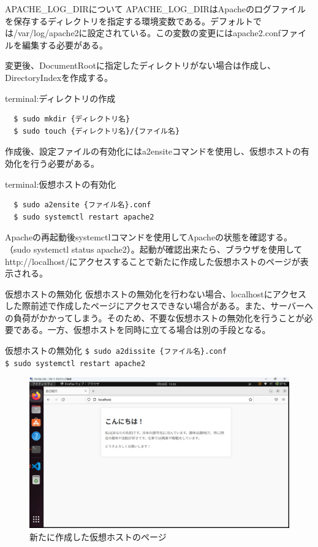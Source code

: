 \documentclass[a4paper, 11pt, dvipdfmx]{jsarticle}
\begin{document}
\begin{hosokubox}{APACHE\_LOG\_DIRについて}
  APACHE\_LOG\_DIRはApacheのログファイルを保存するディレクトリを指定する環境変数である。デフォルトでは/var/log/apache2に設定されている。この変数の変更にはapache2.confファイルを編集する必要がある。
\end{hosokubox}
変更後、DocumentRootに指定したディレクトリがない場合は作成し、DirectoryIndexを作成する。
\begin{commandbox}{terminal:ディレクトリの作成}
  \begin{verbatim}
  $ sudo mkdir {ディレクトリ名}
  $ sudo touch {ディレクトリ名}/{ファイル名}\end{verbatim}
\end{commandbox}
作成後、設定ファイルの有効化にはa2ensiteコマンドを使用し、仮想ホストの有効化を行う必要がある。
\begin{commandbox}{terminal:仮想ホストの有効化}
  \begin{verbatim}
  $ sudo a2ensite {ファイル名}.conf
  $ sudo systemctl restart apache2\end{verbatim}
\end{commandbox}
Apacheの再起動後systemctlコマンドを使用してApacheの状態を確認する。（sudo systemctl status apache2）。起動が確認出来たら、ブラウザを使用してhttp://localhost/にアクセスすることで新たに作成した仮想ホストのページが表示される。
\begin{attentionbox}{仮想ホストの無効化}
  仮想ホストの無効化を行わない場合、localhostにアクセスした際前述で作成したページにアクセスできない場合がある。また、サーバーへの負荷がかかってしまう。そのため、不要な仮想ホストの無効化を行うことが必要である。一方、仮想ホストを同時に立てる場合は別の手段となる。
  \begin{commandbox}{仮想ホストの無効化}
    \verb|$ sudo a2dissite {ファイル名}.conf|\\
    \verb|$ sudo systemctl restart apache2|
  \end{commandbox}
\end{attentionbox}
\begin{figure}[H]
  \centering
  \includegraphics[width=14cm]{images/linux-server/12_3_2-1apache-test-conf.png}
  \caption{新たに作成した仮想ホストのページ}
\end{figure}
\end{document}
